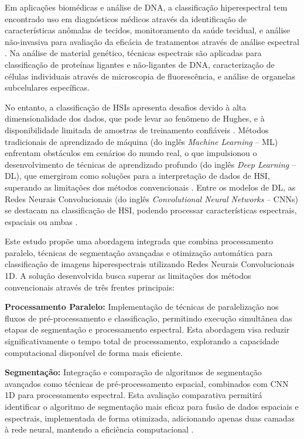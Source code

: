 \documentclass[a4paper,12pt,brazil]{article} %
\begin{document}
Em aplicações biomédicas e análise de DNA, a classificação hiperespectral tem encontrado uso em diagnósticos médicos através da identificação de características anômalas de tecidos, monitoramento da saúde tecidual, e análise não-invasiva para avaliação da eficácia de tratamentos através de análise espectral \cite{hong2024spectral, jensen2016introductory}. Na análise de material genético, técnicas espectrais são aplicadas para classificação de proteínas ligantes e não-ligantes de DNA, caracterização de células individuais através de microscopia de fluorescência, e análise de organelas subcelulares específicas.

No entanto, a classificação de HSIs apresenta desafios devido à alta dimensionalidade dos dados, que pode levar ao fenômeno de Hughes, e à disponibilidade limitada de amostras de treinamento confiáveis \cite{plaza2009recent}. Métodos tradicionais de aprendizado de máquina (do inglês \textit{Machine Learning} -- ML) enfrentam obstáculos em cenários do mundo real, o que impulsionou o desenvolvimento de técnicas de aprendizado profundo (do inglês \textit{Deep Learning} -- DL), que emergiram como soluções para a interpretação de dados de HSI, superando as limitações dos métodos convencionais \cite{lu2020deep, xia2015random}. Entre os modelos de DL, as Redes Neurais Convolucionais (do inglês \textit{Convolutional Neural Networks} -- CNNs) se destacam na classificação de HSI, podendo processar características espectrais, espaciais ou ambas \cite{bera2020analysis, li2015local}.

Este estudo propõe uma abordagem integrada que combina processamento paralelo, técnicas de segmentação avançadas e otimização automática para classificação de imagens hiperespectrais utilizando Redes Neurais Convolucionais 1D. A solução desenvolvida busca superar as limitações dos métodos convencionais através de três frentes principais:

\textbf{Processamento Paralelo:} Implementação de técnicas de paralelização nos fluxos de pré-processamento e classificação, permitindo execução simultânea das etapas de segmentação e processamento espectral. Esta abordagem visa reduzir significativamente o tempo total de processamento, explorando a capacidade computacional disponível de forma mais eficiente.

\textbf{Segmentação:} Integração e comparação de algoritmos de segmentação avançados como técnicas de pré-processamento espacial, combinados com CNN 1D para processamento espectral. Esta avaliação comparativa permitirá identificar o algoritmo de segmentação mais eficaz para fusão de dados espaciais e espectrais, implementada de forma otimizada, adicionando apenas duas camadas à rede neural, mantendo a eficiência computacional \cite{viel2023hyperspectral}.
\end{document}
